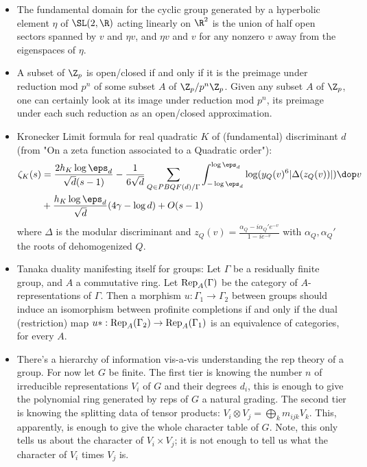 \documentclass[11pt]{amsart}
\begin{document}
\begin{itemize}
	\item The fundamental domain for the cyclic group generated by a hyperbolic element $\eta$ of $\SL(2,\R)$ acting linearly on $\R^2$ is the union of half open sectors spanned by $v$ and $\eta v$, and $\eta v$ and $v$ for any nonzero $v$ away from the eigenspaces of $\eta$.
	\item A subset of $\Z_p$ is open/closed if and only if it is the preimage under reduction mod $p^n$ of some subset $A$ of $\Z_p/p^n \Z_p$. Given any subset $A$ of $\Z_p$, one can certainly look at its image under reduction mod $p^n$, its preimage under each such reduction as an open/closed approximation. 
	\item Kronecker Limit formula for real quadratic $K$ of (fundamental) discriminant $d$ (from "On a zeta function associated to a Quadratic order"):
	\begin{align*}
		\zeta_K(s)&=\frac{2 h_K \log \eps_d}{\sqrt{d}(s-1)} -\frac{1}{6\sqrt{d}} \sum_{Q\in PBQF(d)/\Gamma} \int_{-\log \eps_d}^{\log \eps_d} \log(y_Q(v)^6 |\Delta(z_Q(v))|)\dop v \\
				  &+\frac{h_K \log \eps_d}{\sqrt{d}}(4\gamma -\log d) +O(s-1) 
	\end{align*}
	where $\Delta$ is the modular discriminant and $z_Q(v)=\frac{\alpha_Q-i \alpha_Q ' e^{-v}}{1-ie^{-v}}$ with $\alpha_Q,\alpha_Q'$ the roots of dehomogenized $Q$. 
	\item Tanaka duality manifesting itself for groups: Let $\Gamma$ be a residually finite group, and $A$ a commutative ring. Let $\operatorname{Rep}_A(\Gamma)$ be the category of $A$-representations of $\Gamma$. Then a morphism $u:\Gamma_1\to \Gamma_2$ between groups should induce an isomorphism between profinite completions if and only if the dual (restriction) map $u*: \operatorname{Rep}_A(\Gamma_2) \to \operatorname{Rep}_A(\Gamma_1)$ is an equivalence of categories, for every $A$.
	\item There's a hierarchy of information vis-a-vis understanding the rep theory of a group. For now let $G$ be finite. The first tier is knowing the number $n$ of irreducible representations $V_i$ of $G$ and their degrees $d_i$, this is enough to give the polynomial ring generated by reps of $G$ a natural grading. The second tier is knowing the splitting data of tensor products: $V_i \otimes V_j= \bigoplus_{k} m_{ijk} V_k$. This, apparently, is enough to give the whole character table of $G$. Note, this only tells us about the character of $V_i \times V_j$; it is not enough to tell us what the character of $V_i$ times $V_j$ is. 
\end{itemize}
\end{document}
